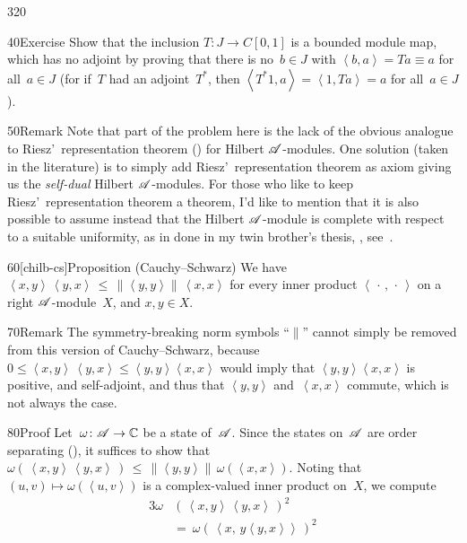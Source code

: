 \begin{parsec}{320}
\begin{point}{40}{Exercise}
Show that the inclusion $T\colon J\to C[0,1]$
is a bounded module map,
which has no adjoint
by proving that there is no~$b\in J$
with $\left<b,a\right>=Ta\equiv a$ for all~$a\in J$
(for if~$T$ had an adjoint~$T^*$,
then $\left<T^*1,a\right>=\left<1,Ta\right>=a$
for all~$a\in J$).
\begin{point}{50}{Remark}%
Note that part of the problem here is the lack 
of the obvious analogue to
Riesz'~representation theorem ()  
for Hilbert $\mathscr{A}$-modules.
One solution (taken in the literature) is to simply 
add Riesz'~representation theorem as axiom
giving us the \emph{self-dual} Hilbert $\mathscr{A}$-modules.
For those
who like to keep Riesz'~representation theorem a theorem,
I'd like to mention that 
it is also possible to assume instead that the Hilbert $\mathscr{A}$-module
is complete with respect to a suitable uniformity,
as in done in my twin brother's thesis, \cite{bas}, see~.
\end{point}
\end{point}
\begin{point}{60}[chilb-cs]{Proposition (Cauchy--Schwarz)}%
	We have
$\left<x,y\right>\,\left<y,x\right>
\,\leq\,\left\|\left<y,y\right>\right\|\,\left<x,x\right>$
for every inner product $\left<\,\cdot\,,\,\cdot\,\right>$
on a right $\mathscr{A}$-module~$X$,
and $x,y\in X$.
\begin{point}{70}{Remark}%
The symmetry-breaking norm symbols ``$\|$'' cannot simply 
be removed from this version of Cauchy--Schwarz,
because 
$0\leq \left<x,y\right>\,\left<y,x\right>
\leq \left<y,y\right>\left<x,x\right>$
would
imply
that $\left<y,y\right>\left<x,x\right>$
is positive, and self-adjoint,
and thus that $\left<y,y\right>$
and~$\left<x,x\right>$ commute,
which is not always the case.
\end{point}
\begin{point}{80}{Proof}%
Let~$\omega\colon \mathscr{A}\to \mathbb{C}$ be a state of~$\mathscr{A}$.
Since the states on~$\mathscr{A}$
are order separating (), 
it suffices to show that
$\omega(\,\left<x,y\right>\,\left<y,x\right>\,)
\,\leq\,\left\|\left<y,y\right>\right\|\,\omega(\left<x,x\right>)$.
Noting that $(u,v)\mapsto \omega(\left<u,v\right>)$
is a complex-valued inner product on~$X$,
we compute
\begin{alignat*}{3}
	\omega&(\,\left<x,y\right>\,\left<y,x\right>\,)^2\\
\ &= \ 
\omega(\,\left<x,\,y\left<y,x\right>\right>\,)^2

\end{alignat*}
\end{point}
\end{point}
\end{parsec}
